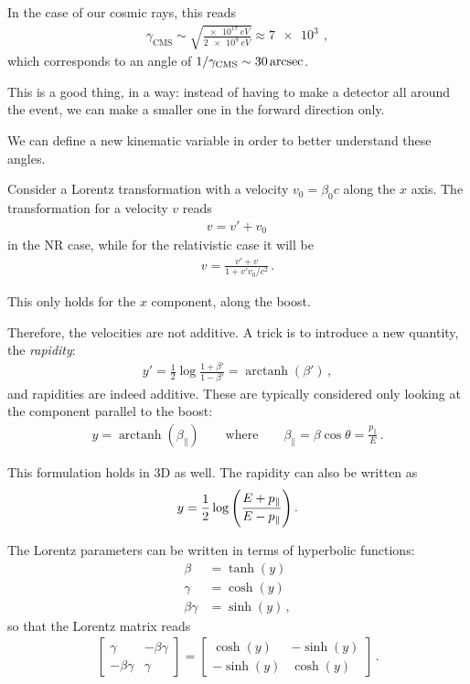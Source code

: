 \documentclass[main.tex]{subfiles}
\begin{document}
In the case of our cosmic rays, this reads 
%
\begin{align}
\gamma _{\text{CMS}} \sim \sqrt{ \frac{\SI{e17}{eV}}{\SI{2e9}{eV}}} \approx \SI{7e3}{}
\,,
\end{align}
%
which corresponds to an angle of \(1 / \gamma _{\text{CMS}}\sim \SI{30}{\arcsec}\). 

This is a good thing, in a way: instead of having to make a detector all around the event, we can make a smaller one in the forward direction only. 

We can define a new kinematic variable in order to better understand these angles. 

Consider a Lorentz transformation with a velocity \(v_0 = \beta_0 c\) along the \(x\) axis. 
The transformation for a velocity \(v\) reads 
%
\begin{align}
v = v' + v_0 
\,
\end{align}
%
in the NR case, while for the relativistic case it will be 
%
\begin{align}
v = \frac{v' + v}{1 + v' v_0 / c^2}
\,.
\end{align}

This only holds for the \(x\) component, along the boost.

Therefore, the velocities are not additive.
A trick is to introduce a new quantity, the \emph{rapidity}:
%
\begin{align}
y' = \frac{1}{2} \log \frac{1 + \beta '}{1 - \beta '} = \operatorname{arctanh} (\beta ')
\,,
\end{align}
%
and rapidities are indeed additive. 
These are typically considered only looking at the component parallel to the boost: 
%
\begin{align}
y = \operatorname{arctanh} (\beta_{\parallel})
\qquad \text{where} \qquad
\beta_{\parallel} = \beta \cos \theta = \frac{p_{\parallel}}{E}
\,.
\end{align}

This formulation holds in 3D as well. 
The rapidity can also be written as 
%
\begin{align}
y = \frac{1}{2} \log \qty(\frac{E + p_{\parallel}}{E - p _{\parallel}})
\,.
\end{align}

The Lorentz parameters can be written in terms of hyperbolic functions: 
%
\begin{align}
\beta &= \tanh(y)  \\
\gamma &= \cosh(y)  \\
\beta \gamma &= \sinh(y)
\,,
\end{align}
%
so that the Lorentz matrix reads 
%
\begin{align}
\left[\begin{array}{cc}
\gamma  & - \beta \gamma  \\ 
- \beta \gamma   &  \gamma 
\end{array}\right]
= \left[\begin{array}{cc}
\cosh(y) & -\sinh(y) \\ 
-\sinh(y) & \cosh(y)
\end{array}\right]
\,.
\end{align}
\end{document}
